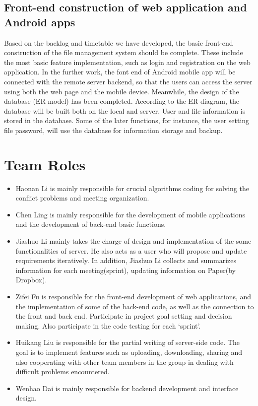 \documentclass[a4paper,11pt]{article}
\begin{document}
\subsection{Front-end construction of web application and Android apps}
Based on the backlog and timetable we have developed, the basic front-end construction of the file management system should be complete. These include the most basic feature implementation, such as login and registration on the web application. In the further work, the font end of Android mobile app will be connected with the remote server backend, so that the users can access the server using both the web page and the mobile device. Meanwhile, the design of the database (ER model) has been completed. According to the ER diagram, the database will be built both on the local and server. User and file information is stored in the database. Some of the later functions, for instance, the user setting file password, will use the database for information storage and backup.
\section{Team Roles}
\begin{itemize}
\item Haonan Li is mainly responsible for crucial algorithms coding for solving the conflict problems and meeting organization.
\item Chen Ling is mainly responsible for the development of mobile applications and the development of back-end basic functions.
\item Jiashuo Li mainly takes the charge of design and implementation of the some functionalities of server. He also acts as a user who will propose and update requirements iteratively. In addition, Jiashuo Li collects and summarizes information for each meeting(sprint), updating information on Paper(by Dropbox).
\item Zifei Fu is responsible for the front-end development of web applications, and the implementation of some of the back-end code, as well as the connection to the front and back end. Participate in project goal setting and decision making. Also participate in the code testing for each ‘sprint’.
\item Huikang Liu is responsible for the  partial writing of server-side code. The goal is to implement features such as uploading, downloading, sharing and also cooperating with other team members in the group in dealing with difficult problems encountered.
\item Wenhao Dai is mainly responsible for backend development and interface design.
\end{itemize}
\end{document}
